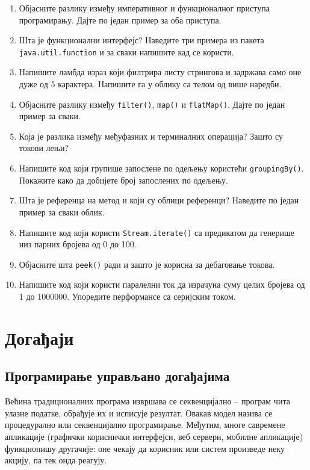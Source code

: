 \begin{enumerate}
\item Објасните разлику између императивног и функционалног приступа програмирању. Дајте по један пример за оба приступа.
\item Шта је функционални интерфејс? Наведите три примера из пакета \texttt{java.util.function} и за сваки напишите кад се користи.
\item Напишите ламбда израз који филтрира листу стрингова и задржава само оне дуже од 5 карактера. Напишите га у облику са телом од више наредби.
\item Објасните разлику између \texttt{filter()}, \texttt{map()} и \texttt{flatMap()}. Дајте по један пример за сваки.
\item Која је разлика између међуфазних и терминалних операција? Зашто су токови лењи?
\item Напишите код који групише запослене по одељењу користећи \texttt{groupingBy()}. Покажите како да добијете број запослених по одељењу.
\item Шта је референца на метод и који су облици референци? Наведите по један пример за сваки облик.
\item Напишите код који користи \texttt{Stream.iterate()} са предикатом да генерише низ парних бројева од 0 до 100.
\item Објасните шта \texttt{peek()} ради и зашто је корисна за дебаговање токова.
\item Напишите код који користи паралелни ток да израчуна суму целих бројева од 1 до 1000000. Упоредите перформансе са серијским током.
\end{enumerate}


\setlength{\parindent}{15pt}
\setlength{\parskip}{0pt}
\chapter{Догађаји}


\section{Програмирање управљано догађајима}

Већина традиционалних програма извршава се секвенцијално – програм чита улазне податке, обрађује их и исписује резултат. Овакав модел назива се процедурално или секвенцијално програмирање. Међутим, многе савремене апликације (графички кориснички интерфејси, веб сервери, мобилне апликације) функционишу другачије: оне чекају да корисник или систем произведе неку акцију, па тек онда реагују.

